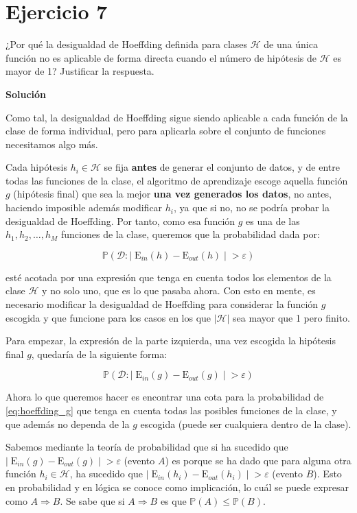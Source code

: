 \documentclass[11pt,a4paper]{article}
\newcommand{\answer}{\noindent\textbf{Solución}}
\newcommand{\addtoc}[1]{\addcontentsline{toc}{section}{#1}}
\begin{document}
\section*{Ejercicio 7}
\addtoc{Ejercicio 7}

\noindent ¿Por qué la desigualdad de Hoeffding definida para clases $\mathcal{H}$ de una única función no es aplicable de
forma directa cuando el número de hipótesis de $\mathcal{H}$ es mayor de 1? Justificar la respuesta.

\answer

Como tal, la desigualdad de Hoeffding sigue siendo aplicable a cada función de la clase de forma individual, pero para 
aplicarla sobre el conjunto de funciones necesitamos algo más. 

Cada hipótesis $h_i \in \mathcal{H}$ se fija \textbf{antes} de generar el conjunto de datos,
y de entre todas las funciones de la clase, el algoritmo de aprendizaje escoge aquella función $g$ (hipótesis final)
que sea la mejor \textbf{una vez generados los datos}, no antes, haciendo imposible además modificar $h_i$, ya que si no, 
no se podría probar la desigualdad de Hoeffding.
Por tanto, como esa función $g$ es una de las $h_1, h_2, \dots, h_M$ funciones de la clase, queremos que la probabilidad
dada por:

\[ \mathbb{P}(\mathcal{D}: | \; \text{E}_{in}(h) - \text{E}_{out}(h) \; | \; > \varepsilon)\]

\noindent esté acotada por una expresión que tenga en cuenta todos los elementos de la clase $\mathcal{H}$
y no solo uno, que es lo que pasaba ahora. Con esto en mente, es necesario modificar la desigualdad de Hoeffding para
considerar la función $g$ escogida y que funcione para los casos en los que $|\mathcal{H}|$ sea mayor que 1 pero finito.

Para empezar, la expresión de la parte izquierda, una vez escogida la hipótesis final $g$, quedaría de la siguiente forma:

\begin{equation}
\label{eq:hoeffding_g}
	\mathbb{P}(\mathcal{D}: | \; \text{E}_{in}(g) - \text{E}_{out}(g) \; | \; > \varepsilon)
\end{equation}

Ahora lo que queremos hacer es encontrar una cota para la probabilidad de \eqref{eq:hoeffding_g} que tenga en cuenta todas
las posibles funciones de la clase, y que además no dependa de la $g$ escogida (puede ser cualquiera dentro de la clase).

Sabemos mediante la teoría de probabilidad que si ha sucedido que
$| \; \text{E}_{in}(g) - \text{E}_{out}(g) \; | \; > \varepsilon$ (evento $A$) es porque se ha dado que para alguna otra
función $h_i \in \mathcal{H}$, ha sucedido que $| \; \text{E}_{in}(h_i) - \text{E}_{out}(h_i) \; | \; > \varepsilon$
(evento $B$). Esto en probabilidad y en lógica se conoce como implicación, lo cuál se puede expresar como $A \Rightarrow B$.
Se sabe que si $A \Rightarrow B$ es que $\mathbb{P}(A) \leq \mathbb{P}(B)$.
\end{document}
